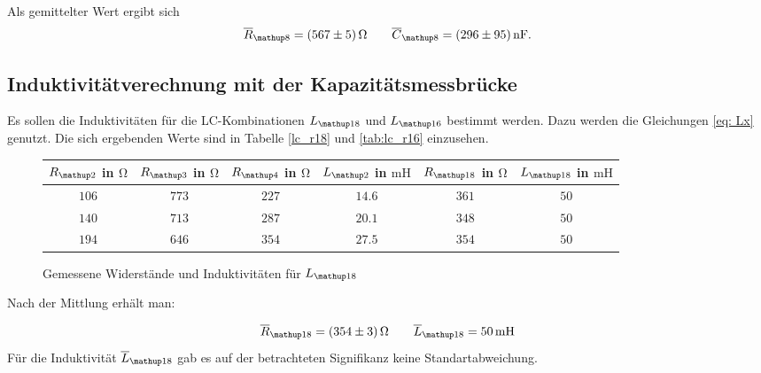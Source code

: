 Als gemittelter Wert ergibt sich
\begin{equation}
\label{eq:wert_r8_c_8}
\overline{R}_{\map{8}}=\SI{567\pm5}{\ohm} \qquad \overline{C}_{\map{8}}=\SI{296\pm95}{\nano\farad}.
\end{equation}

\subsection{Induktivitätverechnung mit der Kapazitätsmessbrücke}

Es sollen die Induktivitäten für die LC-Kombinationen $L\ua{18}$ und
$L\ua{16}$ bestimmt werden. Dazu werden die Gleichungen \eqref{eq: Lx} genutzt.
Die sich ergebenden Werte sind in Tabelle \ref{lc_r18} und \ref{tab:lc_r16} einzusehen.

\begin{figure}
\centering
\caption{Gemessene Widerstände und Induktivitäten für $L\ua{18}$}
  \label{tab:lc_r18}
\begin{tabular}{S S S S S S }
    \toprule
    {$R\ua{2}$ in $\si{\ohm}$} &  {$R\ua{3}$ in $\si{\ohm}$} & {$R\ua{4}$ in $\si{\ohm}$} & {$L\ua{2}$ in $\si{\milli\henry}$}& {$R\ua{18}$ in $\si{\ohm}$} &  {$L\ua{18}$ in $\si{\milli\henry}$} \\
    \midrule
     {$\num{106}$} & {$\num{773}$} &  {$\num{227}$}& {$\num{14,6}$}  &  {$\num{361}$} & {$\num{50}$}\\
     {$\num{140}$} & {$\num{713}$}  & {$\num{287}$} & {$\num{20,1}$} & {$\num{348}$} & {$\num{50}$}\\
     {$\num{194}$} & {$\num{646}$}  & {$\num{354}$} & {$\num{27,5}$} &{$\num{354}$} & {$\num{50}$}  \\
    \bottomrule
  \end{tabular}
 \end{figure}
Nach der Mittlung erhält man:

\begin{equation}
\label{eq:wert_r18_l_18}
\overline{R}_{\map{18}}=\SI{354\pm3}{\ohm} \qquad \overline{L}_{\map{18}}=\SI{50}{\milli\henry}
\end{equation}
Für die Induktivität $\overline{L}_{\map{18}}$ gab es auf der betrachteten Signifikanz keine 
Standartabweichung.

